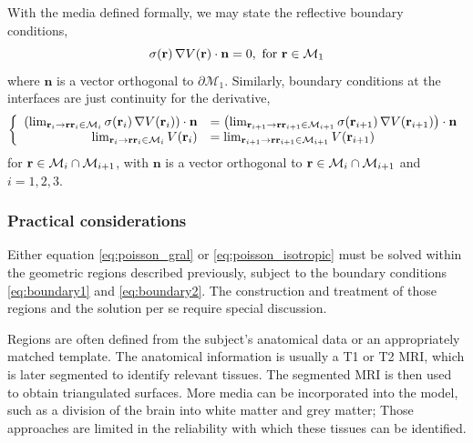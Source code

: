 With the media defined formally, we may state the reflective boundary conditions,
\begin{equation}
\sigma(\mathbf{r})\, \nabla V(\mathbf{r}) \cdot \mathbf{n} = 0, 
\text{ for } \mathbf{r} \in \mathcal{M}_1
\label{eq:boundary1}
\end{equation}
where $\mathbf{n}$ is a vector orthogonal to $\partial\mathcal{M}_1$.
%
Similarly, boundary conditions at the interfaces are just continuity for the derivative,
\begin{equation}
\left\{
\begin{array}{rl}
\left( \lim_{
\mathbf{r}_i\rightarrow \mathbf{r} 
\mathbf{r}_i\in \mathcal{M}_i
}
\sigma(\mathbf{r}_i)
\, 
\nabla 
V(\mathbf{r}_i)
 \right) 
\cdot 
\mathbf{n}
&=
\left( \lim_{\mathbf{r}_{i+1}\rightarrow \mathbf{r} \mathbf{r}_{i+1}\in \mathcal{M}_{i+1}}
\sigma(\mathbf{r}_{i+1})\, \nabla V(\mathbf{r}_{i+1}) \right) \cdot \mathbf{n} 
\\
{\lim_{\mathbf{r}_i\rightarrow \mathbf{r} \mathbf{r}_i\in \mathcal{M}_i}
V(\mathbf{r}_i)} 
&=
{\lim_{\mathbf{r}_{i+1}\rightarrow \mathbf{r} \mathbf{r}_{i+1}\in \mathcal{M}_{i+1}}
V(\mathbf{r}_{i+1})} 
\end{array}
\right.
\label{eq:boundary2}
\end{equation}
for $\mathbf{r} \in \mathcal{M}_i \cap \mathcal{M}_{i+1}$, 
with 
$\mathbf{n}$ is a vector orthogonal to
$\mathbf{r} \in \mathcal{M}_i \cap \mathcal{M}_{i+1}$
and
$i = 1, 2, 3$.

\subsubsection{Practical considerations}

Either equation \eqref{eq:poisson_gral} or \eqref{eq:poisson_isotropic} must be solved within the geometric regions described previously, subject to the boundary conditions \eqref{eq:boundary1} and \eqref{eq:boundary2}.
%
The construction and treatment of those regions and the solution per se require special discussion.

Regions are often defined from the subject's anatomical data or an appropriately matched template.
%
The anatomical information is usually a T1 or T2 MRI, which is later segmented to identify relevant tissues. The segmented MRI is then used to obtain triangulated surfaces. 
%
More media can be incorporated into the model, such as a division of the brain into white matter and grey matter;
Those approaches are limited in the reliability with which these tissues can be identified.

